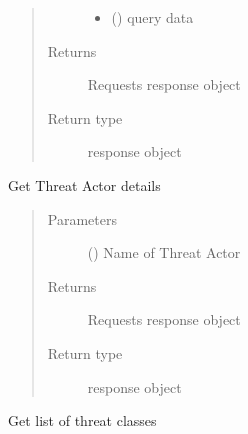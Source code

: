 \documentclass[letterpaper,10pt,english]{sphinxmanual}
\begin{document}
\begin{fulllineitems}
\begin{fulllineitems}
\begin{quote}
\begin{description}
\begin{itemize}
\item {} 
\sphinxAtStartPar
{} () \textendash{} query data

\end{itemize}

\item[{Returns}] \leavevmode
\sphinxAtStartPar
Requests response object

\item[{Return type}] \leavevmode
\sphinxAtStartPar
response object

\end{description}\end{quote}

\end{fulllineitems}


\begin{fulllineitems}
\label{\detokenize{b1td-class:bloxone.b1td.threat_actor}}
\sphinxAtStartPar
Get Threat Actor details
\begin{quote}\begin{description}
\item[{Parameters}] \leavevmode
\sphinxAtStartPar
{} () \textendash{} Name of Threat Actor

\item[{Returns}] \leavevmode
\sphinxAtStartPar
Requests response object

\item[{Return type}] \leavevmode
\sphinxAtStartPar
response object

\end{description}\end{quote}

\end{fulllineitems}


\begin{fulllineitems}
\label{\detokenize{b1td-class:bloxone.b1td.threat_classes}}
\sphinxAtStartPar
Get list of threat classes


\end{fulllineitems}
\end{fulllineitems}
\end{document}
